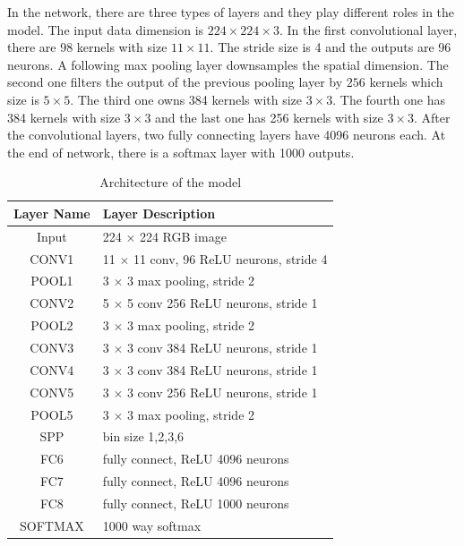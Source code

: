 In the network, there are three types of layers and they play different roles in the model. The input data dimension is $224\times224\times3$. In the first convolutional layer, there are 98 kernels with size $11\times11$. The stride size is 4 and the outputs are 96 neurons. A following max pooling layer downsamples the spatial dimension. The second one filters the output of the previous pooling layer by $256$ kernels which size is $5\times5$. The third one owns 384 kernels with size $3\times3$. The fourth one has 384 kernels with size $3\times3$ and the last one has 256 kernels with size $3\times3$. After the convolutional layers, two fully connecting layers have 4096 neurons each. At the end of network, there is a softmax layer with 1000 outputs.
\begin{table}[h]
\begin{center}
    \begin{tabular}{ | c | p{8cm} | }
    \hline
    Layer Name & Layer Description \\ \hline
    Input & 224 $\times$ 224 RGB image \\ \hline
    CONV1 & 11 $\times$ 11 conv, 96 ReLU neurons, stride 4 \\ \hline
    POOL1 & 3 $\times$ 3 max pooling, stride 2 \\ \hline
    CONV2 & 5 $\times$ 5 conv 256 ReLU neurons, stride 1 \\ \hline
    POOL2 & 3 $\times$ 3 max pooling, stride 2 \\ \hline
    CONV3 & 3 $\times$ 3 conv 384 ReLU neurons, stride 1 \\ \hline
    CONV4 & 3 $\times$ 3 conv 384 ReLU neurons, stride 1 \\ \hline
    CONV5 & 3 $\times$ 3 conv 256 ReLU neurons, stride 1 \\ \hline
    POOL5 & 3 $\times$ 3 max pooling, stride 2 \\ \hline
    SPP & bin size 1,2,3,6 \\ \hline
    FC6 & fully connect, ReLU 4096 neurons\\ \hline
    FC7 & fully connect, ReLU 4096 neurons\\ \hline
    FC8 & fully connect, ReLU 1000 neurons\\ \hline
    SOFTMAX & 1000 way softmax\\ \hline
    \end{tabular}
    \caption{Architecture of the model}
    \label{fig:NetPara}
\end{center}
\end{table}

















